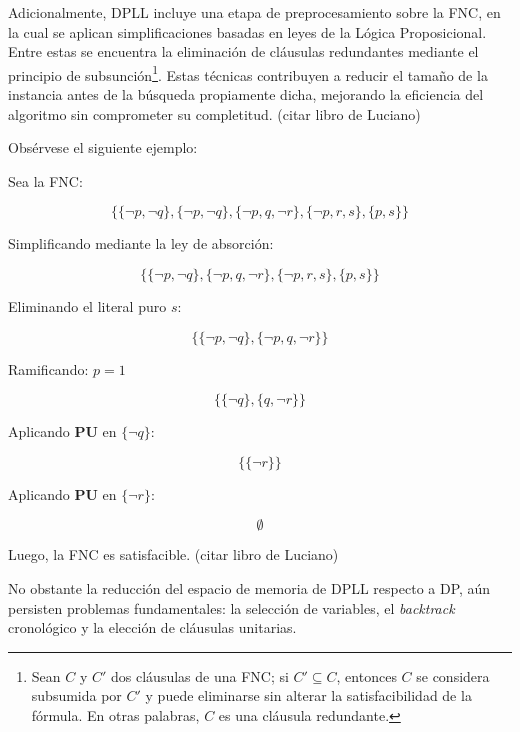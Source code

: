 Adicionalmente, DPLL incluye una etapa de preprocesamiento sobre la FNC, en la cual se aplican simplificaciones basadas en leyes de la L\'ogica Proposicional. Entre estas se encuentra la eliminaci\'on de cl\'ausulas redundantes mediante el principio de subsunci\'on\footnote{Sean $C$ y $C'$ dos cl\'ausulas de una FNC; si $C' \subseteq C$, entonces $C$ se considera subsumida por $C'$ y puede eliminarse sin alterar la satisfacibilidad de la f\'ormula. En otras palabras, $C$ es una cl\'ausula redundante.}. Estas t\'ecnicas contribuyen a reducir el tama\~no de la instancia antes de la b\'usqueda propiamente dicha, mejorando la eficiencia del algoritmo sin comprometer su completitud. (citar libro de Luciano)

Obsérvese el siguiente ejemplo:

Sea la FNC:

\begin{equation*}
\{\{\neg p,\neg q\},\{\neg p, \neg q\},\{\neg p,q,\neg r\},\{\neg p,r,s\},\{p,s\}\}
\end{equation*}

Simplificando mediante la ley de absorción:

\begin{equation*}
\{\{\neg p,\neg q\},\{\neg p,q,\neg r\},\{\neg p,r,s\},\{p,s\}\}
\end{equation*}

Eliminando el literal puro $s$:

\begin{equation*}
\{\{\neg p,\neg q\},\{\neg p,q,\neg r\}\}
\end{equation*}

Ramificando: $p = 1$

\begin{equation*}
\{\{\neg q\},\{q,\neg r\}\}
\end{equation*}

Aplicando \textbf{PU} en $\{\neg q\}$:

\begin{equation*}
\{\{\neg r\}\}
\end{equation*}

Aplicando \textbf{PU} en $\{\neg r\}$:

\begin{equation*}
\emptyset
\end{equation*}

Luego, la FNC es satisfacible. (citar libro de Luciano)

No obstante la reducción del espacio de memoria de DPLL respecto a DP, aún persisten problemas fundamentales: la selección de variables, el \textit{backtrack} cronológico y la elección de cláusulas unitarias.

